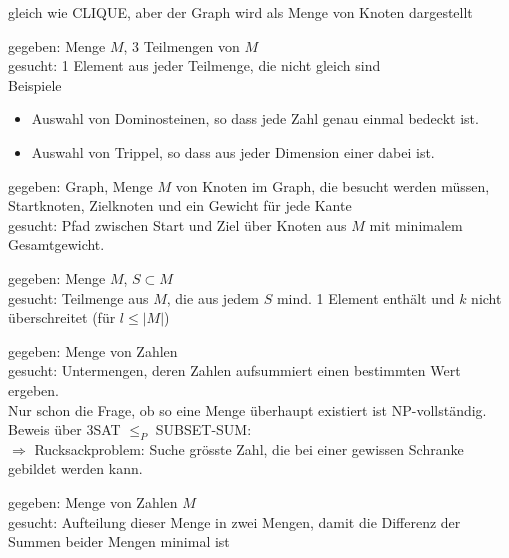 \documentclass[a4paper]{article}
\begin{document}
\begin{multicols}{2}
	\begin{fspec}	
	gleich wie CLIQUE, aber der Graph wird als  Menge von Knoten dargestellt
	\end{fspec}	
		
	\begin{fspec}[3D-Matching]	
	gegeben: Menge $M$, 3 Teilmengen von $M$ \\
	gesucht: 1 Element aus jeder Teilmenge, die nicht gleich sind \\
	Beispiele
	\begin{itemize}
		\item Auswahl von Dominosteinen, so dass jede Zahl genau einmal bedeckt ist.
		\item Auswahl von Trippel, so dass aus jeder Dimension einer dabei ist.
	\end{itemize}
	\end{fspec}	
	
	\begin{fspec}	
	gegeben: Graph, Menge $M$ von Knoten im Graph, die besucht werden müssen, Startknoten, Zielknoten und ein Gewicht für jede Kante \\
	gesucht: Pfad zwischen Start und Ziel über Knoten aus $M$ mit minimalem Gesamtgewicht.
	\end{fspec}	
	
	\begin{fspec}	
	gegeben: Menge $M$, $S \subset M$ \\
	gesucht: Teilmenge aus $M$, die aus jedem $S$ mind. 1 Element enthält und $k$ nicht überschreitet (für $l \leq |M|$)
	\end{fspec}	
	
	\begin{fspec}
	gegeben: Menge von Zahlen \\
	gesucht: Untermengen, deren Zahlen aufsummiert einen bestimmten Wert ergeben. \\
	Nur schon die Frage, ob so eine Menge überhaupt existiert ist NP-vollständig. \\
	Beweis über 3SAT $\leq_P$ SUBSET-SUM: \\
	$\Rightarrow$ Rucksackproblem: Suche grösste Zahl, die bei einer gewissen Schranke gebildet werden kann.
	\end{fspec}	
	
	\begin{fspec}[Partition]	
	gegeben: Menge von Zahlen $M$\\
	gesucht: Aufteilung dieser Menge in zwei Mengen, damit die Differenz der Summen beider Mengen minimal ist
	\end{fspec}	
		

\end{multicols}
\end{document}
